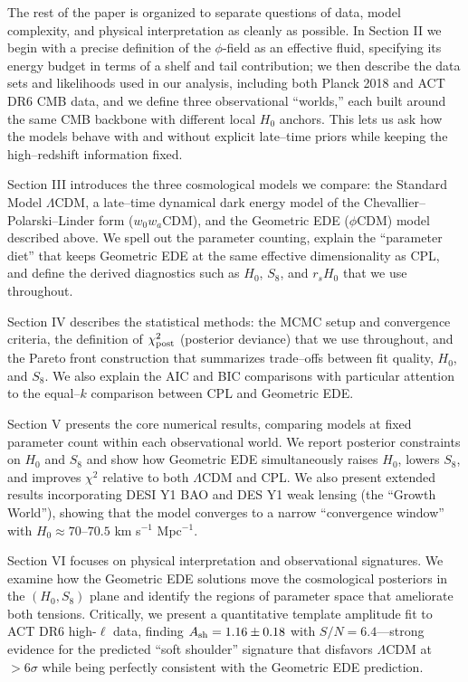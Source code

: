 \documentclass[a4paper,11pt]{article}
\begin{document}
The rest of the paper is organized to separate questions of data, model complexity, and physical interpretation as cleanly as possible. In Section II we begin with a precise definition of the $\phi$-field as an effective fluid, specifying its energy budget in terms of a shelf and tail contribution; we then describe the data sets and likelihoods used in our analysis, including both Planck 2018 and ACT DR6 CMB data, and we define three observational ``worlds,'' each built around the same CMB backbone with different local $H_0$ anchors. This lets us ask how the models behave with and without explicit late--time priors while keeping the high--redshift information fixed.

Section III introduces the three cosmological models we compare: the Standard Model $\Lambda$CDM, a late--time dynamical dark energy model of the Chevallier--Polarski--Linder form ($w_0 w_a$CDM), and the Geometric EDE ($\phi$CDM) model described above. We spell out the parameter counting, explain the ``parameter diet'' that keeps Geometric EDE at the same effective dimensionality as CPL, and define the derived diagnostics such as $H_0$, $S_8$, and $r_s H_0$ that we use throughout.

Section IV describes the statistical methods: the MCMC setup and convergence criteria, the definition of $\chi^2_{\rm post}$ (posterior deviance) that we use throughout, and the Pareto front construction that summarizes trade--offs between fit quality, $H_0$, and $S_8$. We also explain the AIC and BIC comparisons with particular attention to the equal--$k$ comparison between CPL and Geometric EDE.

Section V presents the core numerical results, comparing models at fixed parameter count within each observational world. We report posterior constraints on $H_0$ and $S_8$ and show how Geometric EDE simultaneously raises $H_0$, lowers $S_8$, and improves $\chi^2$ relative to both $\Lambda$CDM and CPL. We also present extended results incorporating DESI Y1 BAO and DES Y1 weak lensing (the ``Growth World''), showing that the model converges to a narrow ``convergence window'' with $H_0 \approx 70$--$70.5$ km s$^{-1}$ Mpc$^{-1}$.

Section VI focuses on physical interpretation and observational signatures. We examine how the Geometric EDE solutions move the cosmological posteriors in the $(H_0, S_8)$ plane and identify the regions of parameter space that ameliorate both tensions. Critically, we present a quantitative template amplitude fit to ACT DR6 high-$\ell$ data, finding $A_{\rm sh} = 1.16 \pm 0.18$ with $S/N = 6.4$---strong evidence for the predicted ``soft shoulder'' signature that disfavors $\Lambda$CDM at $>6\sigma$ while being perfectly consistent with the Geometric EDE prediction.
\end{document}
